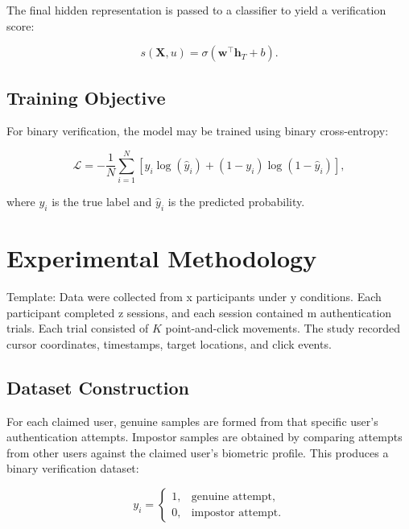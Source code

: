 \documentclass[conference]{IEEEtran}
\begin{document}
The final hidden representation is passed to a classifier to yield a
verification score:

\begin{equation}
s(\mathbf{X},u)
=
\sigma
\left(
\mathbf{w}^{\top}\mathbf{h}_{T}
+
b
\right).
\label{eq:model_score}
\end{equation}

\subsection{Training Objective}

For binary verification, the model may be trained using binary cross-entropy:

\begin{equation}
\mathcal{L}
=
-
\frac{1}{N}
\sum_{i=1}^{N}
\left[
y_i\log(\hat{y}_i)
+
(1-y_i)\log(1-\hat{y}_i)
\right],
\label{eq:bce_loss}
\end{equation}

where $y_i$ is the true label and $\hat{y}_i$ is the predicted probability.


\section{Experimental Methodology}


Template: Data were collected from x participants under y conditions. Each participant completed z sessions, and each session contained m authentication trials. Each trial consisted of $K$ point-and-click movements. The study recorded cursor coordinates, timestamps, target locations, and click events. 

\subsection{Dataset Construction}

For each claimed user, genuine samples are formed from that specific user's authentication attempts. Impostor samples are obtained by comparing attempts from other users against the claimed user's biometric profile. This produces a binary verification dataset:

\begin{equation}
y_i
=
\begin{cases}
1, & \text{genuine attempt},\\
0, & \text{impostor attempt}.
\end{cases}
\label{eq:binary_labels}
\end{equation}
\end{document}
